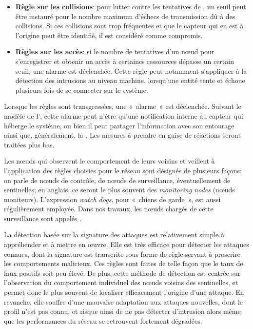 \begin{itemize}
    \item \textbf{Règle sur les collisions}: pour lutter contre les tentatives de , un seuil peut être instauré pour le nombre maximum d'échecs de transmission dû à des collisions. Si ces collisions sont trop fréquentes et que le capteur qui en est à l'origine peut être identifié, il est considéré comme compromis.
    \item \textbf{Règles sur les accès}: si le nombre de tentatives d'un nœud pour s'enregistrer et obtenir un accès à certaines ressources dépasse un certain seuil, une alarme est déclenchée. Cette règle peut notamment s'appliquer à la détection des intrusions au niveau machine, lorsqu'une entité tente et échoue plusieurs fois de se connecter sur le système.
\end{itemize}

Lorsque les règles sont transgressées, une « alarme » est déclenchée.
Suivant le modèle de l'\IDS, cette alarme peut n'être qu'une notification interne au capteur qui héberge le système, ou bien il peut partager l'information avec son entourage ainsi que, généralement, la \sdb.
Les mesures à prendre en guise de réactions seront traitées plus bas.

Les nœuds qui observent le comportement de leurs voisins et veillent à l'application des règles choisies pour le réseau sont désignés de plusieurs façons: on parle de nœuds de contrôle, de nœuds de surveillance, éventuellement de sentinelles; en anglais, ce seront le plus souvent des \textit{monitoring nodes} (nœuds moniteurs).
L'expression \textit{watch dogs}, pour « chiens de garde », est aussi régulièrement employée.
Dans nos travaux, les nœuds chargés de cette surveillance sont appelés \cns.

La détection basée sur la signature des attaques est relativement simple à appréhender et à mettre en œuvre.
Elle est très efficace pour détecter les attaques connues, dont la signature est transcrite sous forme de règle servant à proscrire les comportements malicieux.
Ces règles sont faites de telle façon que le taux de faux positifs soit peu élevé.
De plus, cette méthode de détection est centrée sur l'observation du comportement individuel des nœuds voisins des sentinelles, et permet donc le plus souvent de localiser efficacement l'origine d'une attaque.
En revanche, elle souffre d'une mauvaise adaptation aux attaques nouvelles, dont le profil n'est pas connu, et risque ainsi de ne pas détecter d'intrusion alors même que les performances du réseau se retrouvent fortement dégradées.

